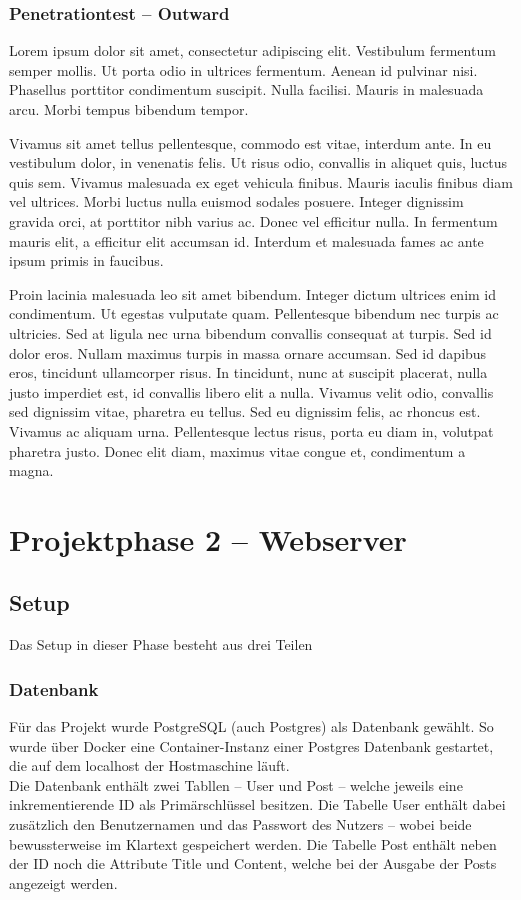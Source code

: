 \subsection{Penetrationtest – Outward}

Lorem ipsum dolor sit amet, consectetur adipiscing elit. Vestibulum fermentum semper mollis. Ut porta odio in ultrices fermentum. Aenean id pulvinar nisi. Phasellus porttitor condimentum suscipit. Nulla facilisi. Mauris in malesuada arcu. Morbi tempus bibendum tempor.

Vivamus sit amet tellus pellentesque, commodo est vitae, interdum ante. In eu vestibulum dolor, in venenatis felis. Ut risus odio, convallis in aliquet quis, luctus quis sem. Vivamus malesuada ex eget vehicula finibus. Mauris iaculis finibus diam vel ultrices. Morbi luctus nulla euismod sodales posuere. Integer dignissim gravida orci, at porttitor nibh varius ac. Donec vel efficitur nulla. In fermentum mauris elit, a efficitur elit accumsan id. Interdum et malesuada fames ac ante ipsum primis in faucibus.

Proin lacinia malesuada leo sit amet bibendum. Integer dictum ultrices enim id condimentum. Ut egestas vulputate quam. Pellentesque bibendum nec turpis ac ultricies. Sed at ligula nec urna bibendum convallis consequat at turpis. Sed id dolor eros. Nullam maximus turpis in massa ornare accumsan. Sed id dapibus eros, tincidunt ullamcorper risus. In tincidunt, nunc at suscipit placerat, nulla justo imperdiet est, id convallis libero elit a nulla. Vivamus velit odio, convallis sed dignissim vitae, pharetra eu tellus. Sed eu dignissim felis, ac rhoncus est. Vivamus ac aliquam urna. Pellentesque lectus risus, porta eu diam in, volutpat pharetra justo. Donec elit diam, maximus vitae congue et, condimentum a magna.

\chapter{Projektphase 2 – Webserver}
\section{Setup}
Das Setup in dieser Phase besteht aus drei Teilen
\subsection{Datenbank}
Für das Projekt wurde PostgreSQL (auch Postgres) als Datenbank gewählt. So wurde über Docker eine Container-Instanz einer Postgres Datenbank gestartet, die auf dem localhost der Hostmaschine läuft. \\
Die Datenbank enthält zwei Tabllen – User und Post – welche jeweils eine inkrementierende ID als Primärschlüssel besitzen. 
Die Tabelle User enthält dabei zusätzlich den Benutzernamen und das Passwort des Nutzers – wobei beide bewussterweise im Klartext gespeichert werden. 
Die Tabelle Post enthält neben der ID noch die Attribute Title und Content, welche bei der Ausgabe der Posts angezeigt werden. 
